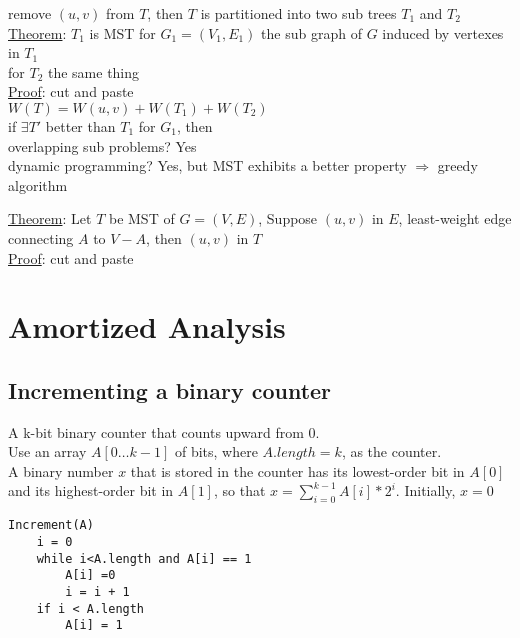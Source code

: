 \documentclass{article}
\begin{document}
remove $(u, v)$ from $T$, then $T$ is partitioned into two sub trees $T_1$ and $T_2$\\

\noindent
\underline{Theorem}: $T_1$ is MST for $G_1 = (V_1, E_1)$ the sub graph of $G$ induced by vertexes in $T_1$\\
for $T_2$ the same thing\\
\underline{Proof}: cut and paste\\
$W(T) = W(u, v) + W(T_1) + W(T_2)$\\
if $\exists T'$ better than $T_1$ for $G_1$, then\\
overlapping sub problems? Yes\\
dynamic programming? Yes, but MST exhibits a better property $\Rightarrow$ greedy algorithm

\noindent
\underline{Theorem}: Let $T$ be MST of $G=(V, E)$, Suppose $(u,v)$ in $E$, least-weight edge connecting $A$ to $V-A$, then $(u,v)$ in $T$\\
\underline{Proof}: cut and paste

\section{Amortized Analysis}
\subsection{Incrementing a binary counter}
A k-bit binary counter that counts upward from $0$.\\
Use an array $A[0…k-1]$ of bits, where $A.length = k$, as the counter.\\
A binary number $x$ that is stored in the counter has its lowest-order bit in $A[0]$ and its highest-order bit in $A[1]$, so that $x=\sum_{i=0}^{k-1} A[i]*2^i$. Initially, $x = 0$
\begin{verbatim}
Increment(A)
    i = 0
    while i<A.length and A[i] == 1
        A[i] =0
        i = i + 1
    if i < A.length
        A[i] = 1
\end{verbatim}
\end{document}
